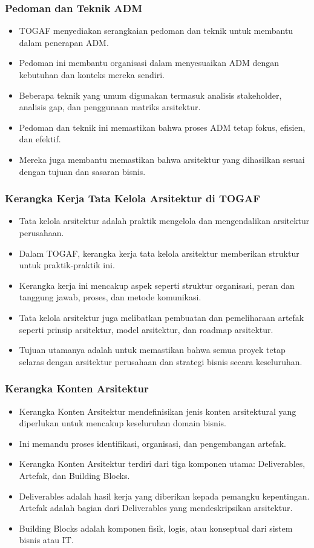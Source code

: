 \documentclass{beamer}
\begin{document}
	\begin{frame}
		\frametitle{Pedoman dan Teknik ADM}
		\begin{itemize}
			\item TOGAF menyediakan serangkaian pedoman dan teknik untuk membantu dalam penerapan ADM.
			\item Pedoman ini membantu organisasi dalam menyesuaikan ADM dengan kebutuhan dan konteks mereka sendiri.
			\item Beberapa teknik yang umum digunakan termasuk analisis stakeholder, analisis gap, dan penggunaan matriks arsitektur.
			\item Pedoman dan teknik ini memastikan bahwa proses ADM tetap fokus, efisien, dan efektif.
			\item Mereka juga membantu memastikan bahwa arsitektur yang dihasilkan sesuai dengan tujuan dan sasaran bisnis.
		\end{itemize}
	\end{frame}
	\begin{frame}
		\frametitle{Kerangka Kerja Tata Kelola Arsitektur di TOGAF}
		\begin{itemize}
			\item Tata kelola arsitektur adalah praktik mengelola dan mengendalikan arsitektur perusahaan.
			\item Dalam TOGAF, kerangka kerja tata kelola arsitektur memberikan struktur untuk praktik-praktik ini.
			\item Kerangka kerja ini mencakup aspek seperti struktur organisasi, peran dan tanggung jawab, proses, dan metode komunikasi.
			\item Tata kelola arsitektur juga melibatkan pembuatan dan pemeliharaan artefak seperti prinsip arsitektur, model arsitektur, dan roadmap arsitektur.
			\item Tujuan utamanya adalah untuk memastikan bahwa semua proyek tetap selaras dengan arsitektur perusahaan dan strategi bisnis secara keseluruhan.
		\end{itemize}
	\end{frame}
	
	\begin{frame}
		\frametitle{Kerangka Konten Arsitektur}
		\begin{itemize}
			\item Kerangka Konten Arsitektur mendefinisikan jenis konten arsitektural yang diperlukan untuk mencakup keseluruhan domain bisnis.
			\item Ini memandu proses identifikasi, organisasi, dan pengembangan artefak.
			\item Kerangka Konten Arsitektur terdiri dari tiga komponen utama: Deliverables, Artefak, dan Building Blocks.
			\item Deliverables adalah hasil kerja yang diberikan kepada pemangku kepentingan. Artefak adalah bagian dari Deliverables yang mendeskripsikan arsitektur.
			\item Building Blocks adalah komponen fisik, logis, atau konseptual dari sistem bisnis atau IT.
		\end{itemize}
	\end{frame}
	
\end{document}

